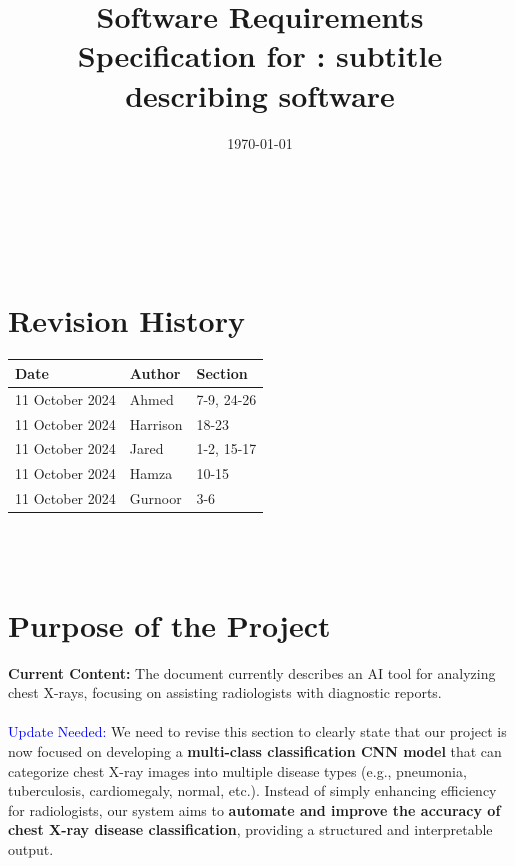 \documentclass[12pt]{article}
\begin{document}
\title{Software Requirements Specification for \progname: subtitle describing software} 
\author{\authname}
\date{\today}
	
\maketitle

~\newpage


\tableofcontents

~\newpage

\section*{Revision History}

\begin{tabularx}{\textwidth}{p{3cm}p{2cm}X}
\toprule {\textbf{Date}} & {Author} & {Section}\\
\midrule
11 October 2024 & Ahmed & 7-9, 24-26 \\
11 October 2024 & Harrison & 18-23 \\
11 October 2024 & Jared & 1-2, 15-17 \\
11 October 2024 & Hamza & 10-15 \\
11 October 2024 & Gurnoor & 3-6 \\
\bottomrule
\end{tabularx}

~\\

~\newpage
\section{Purpose of the Project}

\textbf{Current Content:} The document currently describes an AI tool for analyzing chest X-rays, focusing on assisting radiologists with diagnostic reports.  \\
\\
{\textcolor{blue}{Update Needed:}} We need to revise this section to clearly state that our project is now focused on developing a \textbf{multi-class classification CNN model} that can categorize chest X-ray images into multiple disease types (e.g., pneumonia, tuberculosis, cardiomegaly, normal, etc.). Instead of simply enhancing efficiency for radiologists, our system aims to \textbf{automate and improve the accuracy of chest X-ray disease classification}, providing a structured and interpretable output.\\
\end{document}
